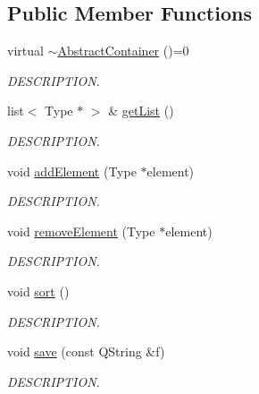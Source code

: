 \subsection*{Public Member Functions}
\begin{DoxyCompactItemize}
\item 
virtual \hyperlink{class_abstract_container_a8f74360ea2ee9747c6f0578dc96e4f15}{$\sim$\+Abstract\+Container} ()=0
\begin{DoxyCompactList}\small\item\em D\+E\+S\+C\+R\+I\+P\+T\+I\+O\+N. \end{DoxyCompactList}\item 
list$<$ Type $\ast$ $>$ \& \hyperlink{class_abstract_container_a71283938f7d05e042d726087c98eec34}{get\+List} ()
\begin{DoxyCompactList}\small\item\em D\+E\+S\+C\+R\+I\+P\+T\+I\+O\+N. \end{DoxyCompactList}\item 
void \hyperlink{class_abstract_container_a2b06c43bf4c6274bc41e52d5811aeb2d}{add\+Element} (Type $\ast$element)
\begin{DoxyCompactList}\small\item\em D\+E\+S\+C\+R\+I\+P\+T\+I\+O\+N. \end{DoxyCompactList}\item 
void \hyperlink{class_abstract_container_a78b14e1e103249dfb159d1305739f51a}{remove\+Element} (Type $\ast$element)
\begin{DoxyCompactList}\small\item\em D\+E\+S\+C\+R\+I\+P\+T\+I\+O\+N. \end{DoxyCompactList}\item 
void \hyperlink{class_abstract_container_a73625446959d1198bc7fbc7d9644b2ab}{sort} ()
\begin{DoxyCompactList}\small\item\em D\+E\+S\+C\+R\+I\+P\+T\+I\+O\+N. \end{DoxyCompactList}\item 
void \hyperlink{class_abstract_container_af89f8e8de96fb60964ef167979be082c}{save} (const Q\+String \&f)
\begin{DoxyCompactList}\small\item\em D\+E\+S\+C\+R\+I\+P\+T\+I\+O\+N. \end{DoxyCompactList}\end{DoxyCompactItemize}
